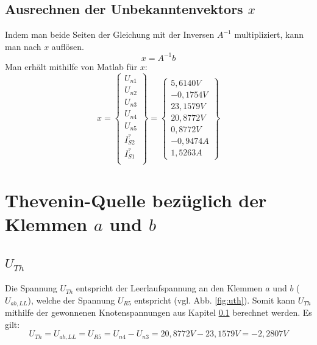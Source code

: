 \documentclass[11pt]{scrartcl}
\begin{document}
\subsection{Ausrechnen der Unbekanntenvektors $x$ } \label{sec:mat}
Indem man beide Seiten der Gleichung mit der Inversen $A^{-1}$ multipliziert, kann man nach $x$ auflösen.
\begin{equation*}
  x = A^{-1} b
\end{equation*}
Man erhält mithilfe von Matlab für $x$:
\begin{equation*}
  \renewcommand{\arraystretch}{1.5}
  x = \begin{Bmatrix}
    U_{n1} \\
    U_{n2} \\
    U_{n3} \\
    U_{n4} \\
    U_{n5} \\
    I_{S2}^? \\
    I_{S1}^? \\
  \end{Bmatrix} =
  \begin{Bmatrix}
    5,6140 \unit{V} \\
    -0,1754 \unit{V} \\
    23, 1579 \unit{V} \\
    20,8772 \unit{V} \\
    0,8772 \unit{V} \\
    -0,9474 \unit{A} \\
    1,5263 \unit{A}
  \end{Bmatrix}
\end{equation*}

\section{Thevenin-Quelle bezüglich der Klemmen $a$ und $b$}\label{sec:thev}
\subsection{$U_{Th}$}
Die Spannung $U_{Th}$ entspricht der Leerlaufspannung an den Klemmen $a$ und $b$ ($U_{ab,LL}$),
welche der Spannung $U_{R5}$ entspricht (vgl. Abb. \ref{fig:uth}).
Somit kann $U_{Th}$ mithilfe der gewonnenen Knotenspannungen aus Kapitel \ref{sec:mat} berechnet werden. Es gilt:
\begin{equation*}
  U_{Th} = U_{ab,LL} = U_{R5} = U_{n4} - U_{n3} = 20,8772 \unit{V} - 23,1579 \unit{V} = -2,2807 \unit{V}
\end{equation*}
\end{document}
